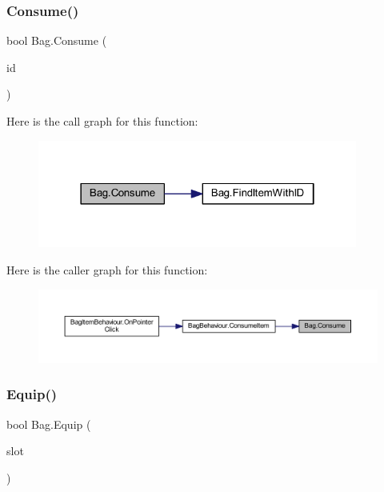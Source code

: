 \subsubsection{\texorpdfstring{Consume()}{Consume()}}
{\footnotesize\ttfamily bool Bag.\+Consume (\begin{DoxyParamCaption}\item[{\mbox{\hyperlink{class_base_item_add9920d2f5a4fa91752714a8f3ab424b}{Base\+Item.\+ID}}}]{id }\end{DoxyParamCaption})}

Here is the call graph for this function\+:
\nopagebreak
\begin{figure}[H]
\begin{center}
\leavevmode
\includegraphics[width=298pt]{class_bag_a85aa679243be4a24a6278d5f68c2ed5e_cgraph}
\end{center}
\end{figure}
Here is the caller graph for this function\+:
\nopagebreak
\begin{figure}[H]
\begin{center}
\leavevmode
\includegraphics[width=350pt]{class_bag_a85aa679243be4a24a6278d5f68c2ed5e_icgraph}
\end{center}
\end{figure}
\mbox{\label{class_bag_a975e4ef7a5647327225e5b587b32c066}} 
\subsubsection{\texorpdfstring{Equip()}{Equip()}}
{\footnotesize\ttfamily bool Bag.\+Equip (\begin{DoxyParamCaption}\item[{int}]{slot }\end{DoxyParamCaption})}

